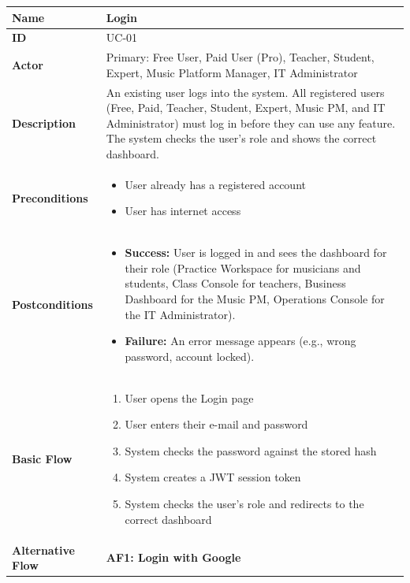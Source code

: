 \documentclass[a4paper]{article}
\newlength{\ucLeft}
\begin{document}
\begin{longtable}{|>{\bfseries}p{\ucLeft}|p{\dimexpr\linewidth-\ucLeft-2\tabcolsep-2\arrayrulewidth}|}
\hline
Name & Login \\ \hline
ID & UC-01 \\ \hline
Actor & Primary: Free User, Paid User (Pro), Teacher, Student, Expert, Music Platform Manager, IT Administrator \\ \hline
Description & An existing user logs into the system. All registered users (Free, Paid, Teacher, Student, Expert, Music PM, and IT Administrator) must log in before they can use any feature. The system checks the user's role and shows the correct dashboard. \\ \hline
Preconditions &
\begin{itemize}[leftmargin=1em, nosep, topsep=2pt, partopsep=0pt, parsep=0pt, after=\strut]
    \item User already has a registered account
    \item User has internet access
\end{itemize}
\\ \hline
Postconditions &
\begin{itemize}[leftmargin=1em, nosep, topsep=2pt, partopsep=0pt, parsep=0pt, after=\strut]
    \item \textbf{Success:} User is logged in and sees the dashboard for their role (Practice Workspace for musicians and students, Class Console for teachers, Business Dashboard for the Music PM, Operations Console for the IT Administrator).
    \item \textbf{Failure:} An error message appears (e.g., wrong password, account locked).
\end{itemize}
\\ \hline
Basic Flow &
\begin{enumerate}[leftmargin=1.5em, nosep, topsep=2pt, partopsep=0pt, parsep=0pt, after=\strut]
    \item User opens the Login page
    \item User enters their e-mail and password
    \item System checks the password against the stored hash
    \item System creates a JWT session token
    \item System checks the user's role and redirects to the correct dashboard
\end{enumerate}
\\ \hline
Alternative Flow &
\textbf{AF1: Login with Google}

\end{longtable}
\end{document}
